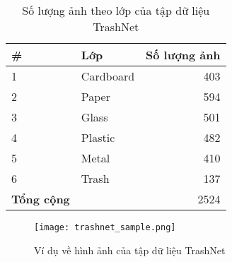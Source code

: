 \documentclass[../the.tex]{subfiles}
\begin{document}
\begin{table}[!ht]
	\centering
	\begin{threeparttable}
		\caption{Số lượng ảnh theo lớp của tập dữ liệu TrashNet}

		\begin{tabular}{llr}
			\hline
			\multicolumn{1}{l}{
				\textbf{\#}}
			 & \multicolumn{1}{l}{\textbf{Lớp}}
			 & \multicolumn{1}{r}{\textbf{Số lượng ảnh}} \\
			\hline

			1
			 & Cardboard
			 & 403                                       \\
			\hline

			2
			 & Paper
			 & 594                                       \\
			\hline

			3
			 & Glass
			 & 501                                       \\
			\hline

			4
			 & Plastic
			 & 482                                       \\
			\hline

			5
			 & Metal
			 & 410                                       \\
			\hline

			6
			 & Trash
			 & 137                                       \\
			\hline


			\textbf{Tổng cộng}
			 &
			 & 2524                                      \\
			\hline
		\end{tabular}
		\label{tab:dataset}
	\end{threeparttable}
\end{table}

\begin{figure}[H]
	\centering
	\texttt{[image: trashnet\_sample.png]}
	\caption{Ví dụ về hình ảnh của tập dữ liệu TrashNet}
	\label{fig:dataset_0}
\end{figure}
\end{document}
